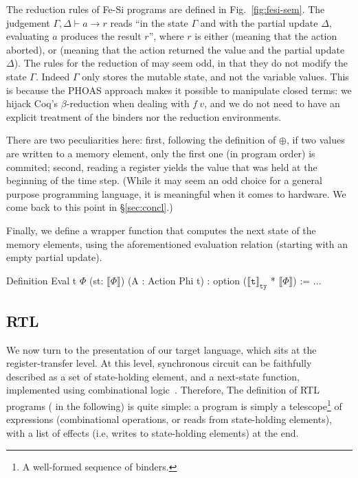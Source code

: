 \documentclass{llncs}
\newcommand{\denote}[1]{\llbracket #1 \rrbracket}
\newcommand{\denotety}[1]{\denote{\mathtt{#1}}_{\mathtt{ty}}}
\begin{document}
The reduction rules of Fe-Si programs are defined in
Fig.~\ref{fig:fesi-sem}. The judgement $\Gamma, \Delta \vdash a \to r$
reads ``in the state $\Gamma$ and with the partial update $\Delta$,
evaluating $a$ produces the result $r$'', where $r$ is either
 (meaning that the action aborted), or %
 (meaning that the action returned the value
 and the partial update $\Delta$). 
%
The rules for the reduction of  may seem odd, in that they
do not modify the state $\Gamma$. Indeed $\Gamma$ only stores the
mutable state, and not the variable values. 
%
This is because the PHOAS approach makes it possible to manipulate
closed terms: we hijack Coq's $\beta$-reduction when dealing with
$f~v$, and we do not need to have an explicit treatment of the binders
nor the reduction environments.

There are two peculiarities here: first, following the definition of
$\oplus$, if two values are written to a memory element, only the
first one (in program order) is commited; second, reading a register
yields the value that was held at the beginning of the time step. 
%
(While it may seem an odd choice for a general purpose programming
language, it is meaningful when it comes to hardware. We come back to
this point in \S\ref{sec:concl}.)

Finally, we define a wrapper function that computes the next state of
the memory elements, using the aforementioned evaluation relation
(starting with an empty partial update). 
\begin{mcoq}
Definition Eval {t} {$\Phi$} (st: $\denote{\Phi}$) (A : Action Phi t) : option ($\denotety{t}$ * $\denote{\Phi}$) := ...
\end{mcoq}

\subsection{RTL} 
We now turn to the presentation of our target language, which sits at
the register-transfer level. At this level, synchronous circuit can be
faithfully described as a set of state-holding element, and a
next-state function, implemented using combinational
logic~\cite{DBLP:journals/cj/Gordon02}.
%
Therefore, The definition of RTL programs ( in the
following) is quite simple: a program is simply a telescope\footnote{A
  well-formed sequence of binders.} of expressions (combinational
operations, or reads from state-holding elements), with a list of
effects (i.e, writes to state-holding elements) at the end.
\end{document}
